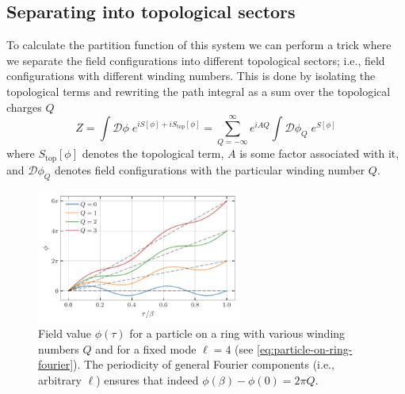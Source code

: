 \documentclass{report}
\begin{document}
\subsection{Separating into topological sectors}
To calculate the partition function of this system we can perform a trick 
where we separate the field configurations into different topological sectors; 
i.e., field configurations with different winding numbers. 
This is done by isolating the topological terms and rewriting the path 
integral as a sum over the topological charges $ Q $
\begin{equation*}
	Z = \int \mathcal{D} \phi \;
			e^{i S[\phi] + i S_{\text{top}}[\phi]}
		= \sum_{Q = -\infty}^{\infty} e^{iA Q}
			\int \mathcal{D}\phi_Q \;e^{S[\phi]}	
\end{equation*}
where $ S_{\text{top}}[\phi]$ denotes the topological term, $ A $ 
is some factor associated with it, and $ \mathcal{D}\phi_Q $ denotes field
configurations with the particular winding number $ Q $. 

\begin{figure}[t]
	\centering
	\includegraphics[width=0.6\textwidth]{figs/november/winding-number-particle-on-ring.pdf}
	\caption{Field value $ \phi(\tau) $ for a particle on a ring with various
	winding numbers $ Q $ and for a fixed mode $ \ell = 4 $ (see
	\cref{eq:particle-on-ring-fourier}). The periodicity of general Fourier
	components (i.e., arbitrary $ \ell $) ensures that indeed $
	\phi(\beta) - \phi(0) = 2\pi Q  $.}
	\label{fig:particle-on-ring-winding-number}
\end{figure}
\end{document}
